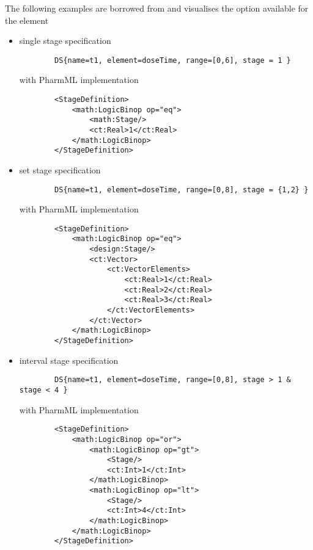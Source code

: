 The following examples are borrowed from \cite{CommetsExamples2015}
and visualises the option available for the  element
\begin{itemize}
\item 
single stage specification
\lstset{language=MLX}
\begin{lstlisting}
        DS{name=t1, element=doseTime, range=[0,6], stage = 1 }
\end{lstlisting}
with PharmML implementation
\lstset{language=XML}
\begin{lstlisting}
        <StageDefinition>
            <math:LogicBinop op="eq">
                <math:Stage/>
                <ct:Real>1</ct:Real>
            </math:LogicBinop>
        </StageDefinition>
\end{lstlisting}

\item 
set stage specification
\lstset{language=MLX}
\begin{lstlisting}
        DS{name=t1, element=doseTime, range=[0,8], stage = {1,2} }
\end{lstlisting}
\lstset{language=XML}
with PharmML implementation
\begin{lstlisting}
        <StageDefinition>
            <math:LogicBinop op="eq">
                <design:Stage/>
                <ct:Vector>
                    <ct:VectorElements>
                        <ct:Real>1</ct:Real>
                        <ct:Real>2</ct:Real>
                        <ct:Real>3</ct:Real>
                    </ct:VectorElements>
                </ct:Vector>
            </math:LogicBinop>
        </StageDefinition>
\end{lstlisting}

\item 
interval stage specification
\lstset{language=MLX}
\begin{lstlisting}
        DS{name=t1, element=doseTime, range=[0,8], stage > 1 & stage < 4 }
\end{lstlisting}
\lstset{language=XML}
with PharmML implementation
\begin{lstlisting}
        <StageDefinition>
            <math:LogicBinop op="or">
                <math:LogicBinop op="gt">
                    <Stage/>
                    <ct:Int>1</ct:Int>
                </math:LogicBinop>
                <math:LogicBinop op="lt">
                    <Stage/>
                    <ct:Int>4</ct:Int>
                </math:LogicBinop>
            </math:LogicBinop>
        </StageDefinition>
\end{lstlisting}
\end{itemize}


